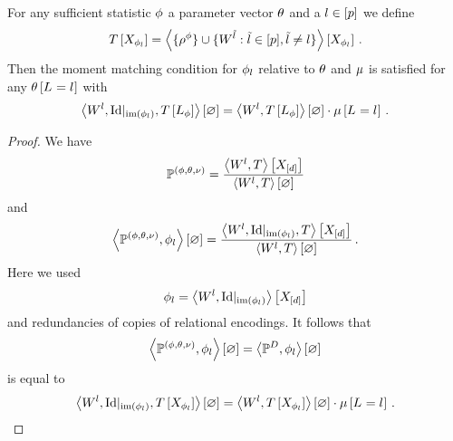 \begin{lemma}\label{lem:mmContractionEquation}
	For any sufficient statistic $\phi$ a parameter vector $\theta$ and a $l\in[p]$ we define
	\begin{align*}
	 	T\left[X_{\phi_{l}}\right] 
		= \left\langle \{\rho^{\phi}\}\cup\{W^{\tilde{l}} : \tilde{l} \in [p], \tilde{l}\neq l\}\right\rangle \left[ X_{\phi_{l}} \right] \, . 
	\end{align*}
	Then the moment matching condition for $\phi_{l}$ relative to $\theta$ and $\mu$ is satisfied for any $\theta\left[L_{}=l_{}\right]$ with
	\begin{align*}
		\left\langle W^{l}, {\mathrm{Id}}|_{\mathrm{im}\left(\phi_{l}\right)}, T\left[L_\phi\right]\right\rangle \left[ \varnothing \right]
		= \left\langle W^{l}, T\left[L_\phi\right]\right\rangle \left[ \varnothing \right] \cdot \mu\left[L_{}=l_{}\right] \, . 
	\end{align*}
\end{lemma}
\begin{proof}
	We have
	\begin{align*}
		\mathbb{P}^{(\phi,\theta,\nu)} = \frac{
			\left\langle W^{l}, T\right\rangle \left[ X_{[d]} \right]
		}{
			\left\langle W^{l}, T\right\rangle \left[ \varnothing \right]
		}
	\end{align*}
	and 
	\begin{align*}
		\left\langle \mathbb{P}^{(\phi,\theta,\nu)}, \phi_{l}\right\rangle \left[ \varnothing \right]
		= \frac{
			\left\langle W^{l}, {\mathrm{Id}}|_{\mathrm{im}\left(\phi_{l}\right)}, T\right\rangle \left[ X_{[d]} \right]
		}{
			\left\langle W^{l}, T\right\rangle \left[ \varnothing \right]
		} \, . 
	\end{align*}
	Here we used
		\[ \phi_{l} = \left\langle W^{l}, {\mathrm{Id}}|_{\mathrm{im}\left(\phi_{l}\right)}\right\rangle \left[ X_{[d]} \right] \]
	and redundancies of copies of relational encodings.
	It follows that 
	\begin{align*}
		\left\langle \mathbb{P}^{(\phi,\theta,\nu)},\phi_{l}\right\rangle \left[ \varnothing \right] = \left\langle \mathbb{P}^{D},\phi_{l}\right\rangle \left[ \varnothing \right]
	\end{align*}
	is equal to
	\begin{align*}
		\left\langle W^{l}, {\mathrm{Id}}|_{\mathrm{im}\left(\phi_{l}\right)}, T\left[X_{\phi_{l}}\right]\right\rangle \left[ \varnothing \right]
		= \left\langle W^{l},T\left[X_{\phi_{l}}\right]\right\rangle \left[ \varnothing \right] \cdot \mu\left[L_{}=l_{}\right] \, . 
	\end{align*}	
\end{proof}


